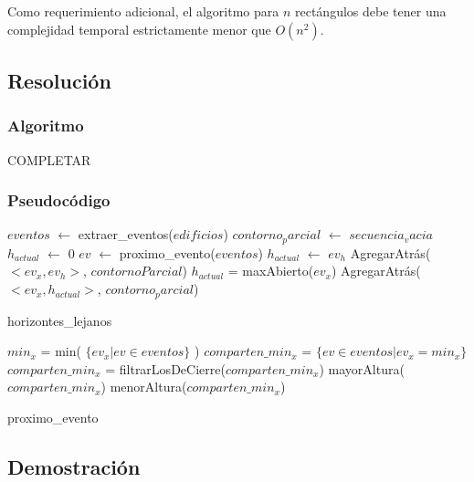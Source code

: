 Como requerimiento adicional, el algoritmo para $n$ rectángulos debe tener una complejidad temporal estrictamente menor que $O(n^2)$.

\subsection{Resoluci\'on}
\subsubsection{Algoritmo}
COMPLETAR

\subsubsection{Pseudoc\'odigo}
\begin{algorithm}[H]
\begin{algorithmic}
\STATE $eventos$ $\gets$ extraer\_eventos($edificios$)
\STATE $contorno_parcial$ $\gets$ $secuencia_vacia$
\STATE $h_{actual}$ $\gets$ 0
	\STATE $ev$ $\gets$ proximo\_evento($eventos$)
			\STATE $h_{actual}$ $\gets$ $ev_h$
			\STATE AgregarAtrás($<ev_x, ev_h>$, $contornoParcial$)
		\ENDIF
	\ELSE
			\STATE $h_{actual}$ = maxAbierto($ev_x$)
			\STATE AgregarAtrás($<ev_x, h_{actual}>$, $contorno_parcial$)  
		\ENDIF
	\ENDIF
\ENDWHILE
\caption{horizontes\_lejanos}
\end{algorithmic}
\end{algorithm}

\begin{algorithm}[H]
\begin{algorithmic}
	\STATE $min_x$ = min( $\{ ev_x | ev \in eventos\}$ )
	\STATE $comparten\_min_x$ = $\{ ev \in eventos | ev_x = min_x \}$
		\STATE $comparten\_min_x$ = filtrarLosDeCierre($comparten\_min_x$)
		\RETURN mayorAltura($comparten\_min_x$)
	\ELSE
		\RETURN menorAltura($comparten\_min_x$)
	\ENDIF
\caption{proximo\_evento}
\end{algorithmic}
\end{algorithm}

\subsection{Demostraci\'on}


